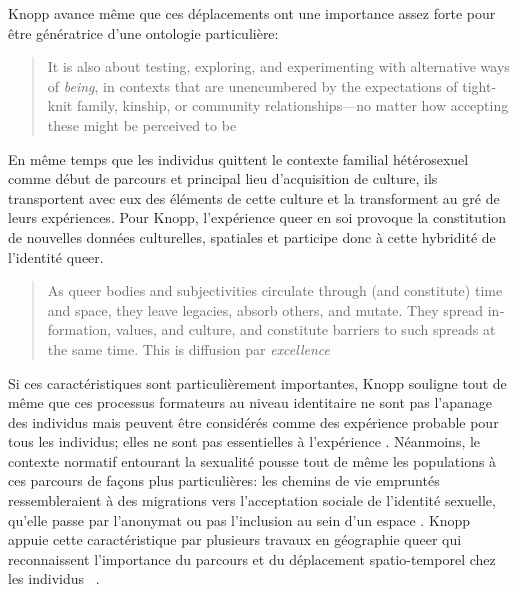 Knopp avance même que ces déplacements ont une importance assez forte pour être génératrice d'une ontologie particulière:
\foreignblockquote{english}[{\cite[123]{Knopp2004}}][.]{It is also about
  testing, exploring, and experimenting with alternative ways of \emph{being},
  in contexts that are unencumbered by the expectations of tight-knit family,
  kinship, or community relationships—no matter how accepting these might be
  perceived to be} 
En même temps que les individus \lgbt{} quittent le contexte familial hétérosexuel comme début de parcours et principal lieu d'acquisition de culture, ils transportent avec eux des éléments de cette culture et la transforment au gré de leurs expériences. 
Pour Knopp, l'expérience queer en soi provoque la constitution de nouvelles données culturelles, spatiales et participe donc à cette hybridité de l'identité queer.
\foreignblockquote{english}[{\cite[130]{Knopp2004}}][.]{As queer bodies and
  subjectivities circulate through (and constitute) time and space, they leave
  legacies, absorb others, and mutate. They spread information, values, and
  culture, and constitute barriers to such spreads at the same time. This is
  diffusion par \emph{excellence}}

Si ces caractéristiques sont particulièrement importantes, Knopp souligne tout de même que ces processus formateurs au niveau identitaire ne sont pas l'apanage des individus \lgbt{} mais peuvent être considérés comme des expérience probable pour tous les individus; elles ne sont pas essentielles à l'expérience \lgbt{}.
Néanmoins, le contexte normatif entourant la sexualité pousse tout de même les populations \lgbt{} à ces parcours de façons plus particulières: les chemins de vie empruntés ressembleraient à des migrations vers l'acceptation sociale de l'identité sexuelle, qu'elle passe par l'anonymat ou pas l'inclusion au sein d'un espace \lgbt{}. 
Knopp appuie cette caractéristique par plusieurs travaux en géographie queer qui reconnaissent l'importance du parcours et du déplacement spatio-temporel chez les individus \lgbt{}~\citep[123]{Knopp2004}.



